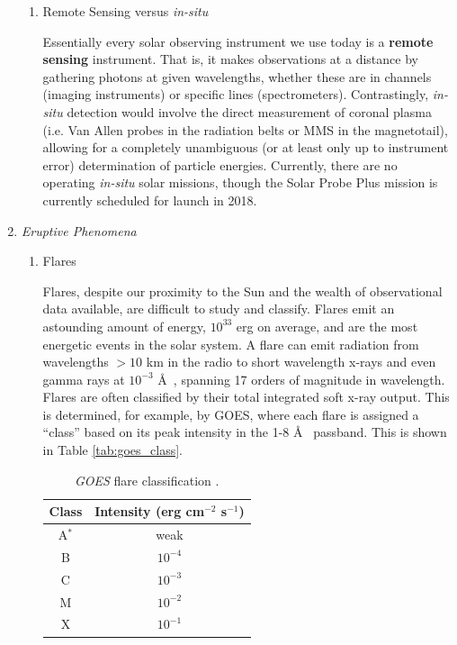 \begin{enumerate}
\begin{enumerate}
				\item{Remote Sensing versus \textit{in-situ}}
				\par Essentially every solar observing instrument we use today is a \textbf{remote sensing} instrument. That is, it makes observations at a distance by gathering photons at given wavelengths, whether these are in channels (imaging instruments) or specific lines (spectrometers). Contrastingly, \textit{in-situ} detection would involve the direct measurement of coronal plasma (i.e. Van Allen probes in the radiation belts or MMS in the magnetotail), allowing for a completely unambiguous (or at least only up to instrument error) determination of particle energies. Currently, there are no operating \textit{in-situ} solar missions, though the Solar Probe Plus mission is currently scheduled for launch in 2018.
			\end{enumerate}
			\item{\em Eruptive Phenomena}
			\begin{enumerate}
				\item{Flares}\\
				\citep[see][Ch. 10]{golub_solar_2010}
				\par Flares, despite our proximity to the Sun and the wealth of observational data available, are difficult to study and classify. Flares emit an astounding amount of energy, $10^{33}$ erg on average, and are the most energetic events in the solar system. A flare can emit radiation from wavelengths $>10$ km in the radio to short wavelength x-rays and even gamma rays at $10^{-3}$ \AA~, spanning 17 orders of magnitude in wavelength. Flares are often classified by their total integrated soft x-ray output. This is determined, for example, by GOES, where each flare is assigned a ``class'' based on its peak intensity in the 1-8 \AA~ passband. This is shown in Table \ref{tab:goes_class}.
				\begin{table}
					\centering
					\begin{tabular}{cc}
						\hline
						\hline
						Class & Intensity (erg cm$^{-2}$ s$^{-1}$) \\ \hline
						A$^{*}$ & weak \\
						B & $10^{-4}$ \\
						C & $10^{-3}$ \\
						M & $10^{-2}$ \\
						X & $10^{-1}$ \\ \hline\hline
					\end{tabular}
					\caption{\textit{GOES} flare classification \citep{golub_solar_2010}.}

\end{table}
\end{enumerate}
\end{enumerate}
